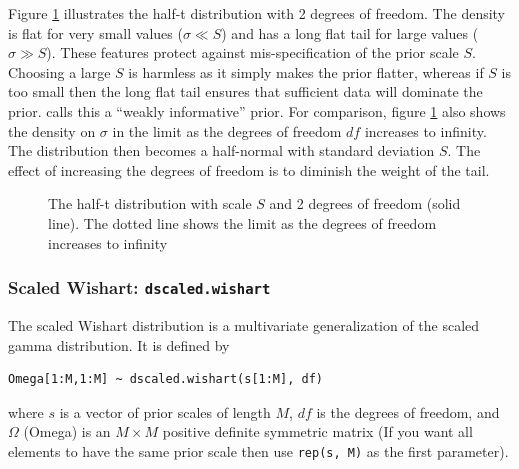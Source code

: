 \documentclass[11pt, a4paper, titlepage]{report}
\begin{document}
{Figure \ref{figure:halft} illustrates the half-t distribution with 2
degrees of freedom. The density is flat for very small values ($\sigma
\ll S$) and has a long flat tail for large values ($\sigma \gg
S$). These features protect against mis-specification of the prior
scale $S$.  Choosing a large $S$ is harmless as it simply makes the
prior flatter, whereas if $S$ is too small then the long flat tail
ensures that sufficient data will dominate the
prior. \citet{Gelman2006} calls this a ``weakly informative''
prior. For comparison, figure \ref{figure:halft} also shows the
density on $\sigma$ in the limit as the degrees of freedom $df$
increases to infinity. The distribution then becomes a half-normal
with standard deviation $S$. The effect of increasing the degrees of
freedom is to diminish the weight of the tail.

\begin{figure}
\caption{The half-t distribution with scale $S$ and 2 degrees of
  freedom (solid line). The dotted line shows the limit as the
  degrees of freedom increases to infinity \label{figure:halft}}
\end{figure}

\subsubsection{Scaled Wishart: \texttt{dscaled.wishart}}

The scaled Wishart distribution is a multivariate generalization
of the scaled gamma distribution. It is defined by
\begin{verbatim}
Omega[1:M,1:M] ~ dscaled.wishart(s[1:M], df)
\end{verbatim}
where $s$ is a vector of prior scales of length $M$, $df$ is the
degrees of freedom, and $\Omega$ (Omega) is an $M \times M$ positive
definite symmetric matrix (If you want all elements to have the
same prior scale then use \texttt{rep(s, M)} as the first parameter).

}
\end{document}

